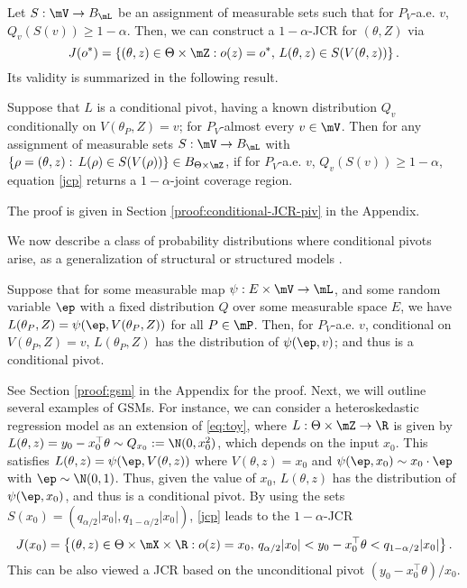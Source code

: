 \documentclass[english]{article}
\begin{document}
Let $S: \mV \to B_{\mL}$ be an assignment of measurable sets such that for $P_V$-a.e. $v$,  $Q_v(S(v))\ge 1-\alpha$.
Then, we can 
 construct a  $1-\alpha$-JCR for $(\theta,Z)$ via
\begin{equation}\label{jcp}
    J(o^*)= \left\{(\theta,z) 
\in\Theta\times\mZ: 
o(z) = o^*,\,
L(\theta,z) \in S(V(\theta,z)) \right\}.
\end{equation}
Its validity is summarized in the following result.
\begin{theorem}\label{thm:conditional-JCR-piv}
Suppose that $L$ is a conditional pivot, having a known distribution $Q_v$ conditionally on $V(\theta_P,Z)=v$; 
for $P_V$-almost every $v\in\mV$. 
Then for any assignment of measurable sets $S: \mV \to B_{\mL}$ with $\{\rho = (\theta,z):\, L(\rho) \in S(V(\rho))\} \in B_{\Theta\times \mZ}$, if for $P_V$-a.e. $v$,  $Q_v(S(v))\ge 1-\alpha$, 
equation \eqref{jcp} returns a $1-\alpha$-joint coverage region. 
\end{theorem}
The proof is given in Section \ref{proof:conditional-JCR-piv} in the Appendix.

We now describe a class of probability distributions where conditional pivots arise, as a generalization of structural or structured models \citep{fraser1966structural,fraser1968structure,fraser1971events}.
\begin{proposition}\label{prop:gsm}
    Suppose that
for some 
measurable map
$\psi:E\times \mV\to \mL$, and
some random variable $\ep$ with a fixed distribution $Q$ over some measurable space $E$,
we have
$L(\theta_P,Z) = \psi(\ep, V(\theta_P,Z))$  for all $P\in \mP$. Then, for $P_V$-a.e. $v$, conditional on $V(\theta_P,Z)=v$, $L(\theta_P,Z)$ has the distribution of $\psi(\ep,v)$; and thus is a conditional pivot.
\end{proposition}
See Section \ref{proof:gsm}
 in the Appendix for the proof.
Next, we will outline several examples of GSMs.
For instance, we can consider a heteroskedastic regression model as an extension of \eqref{eq:toy}, where
$L:\Theta\times\mZ\to \R$ is given by
$ L(\theta,z) = y_0 - x_0^\top\theta \sim Q_{x_0} := \N(0,x_0^2)$, which depends on the input $x_0$.
This satisfies $L(\theta,z)=\psi(\ep,V(\theta,z))$ where $V(\theta,z)=x_0$ and $\psi(\ep,x_0) \sim x_0\cdot \ep$ with $\ep \sim \N(0,1)$.
Thus, given the value of $x_0$, $L(\theta,z)$ has the distribution of $\psi(\ep,x_0)$, and thus is a conditional pivot.
By using the sets 
$S(x_0) = (q_{\alpha/2}|x_0|, q_{1 - \alpha/2}|x_0|)$,
\eqref{jcp} leads to the
$1-\alpha$-JCR
\begin{align*}
    J(x_0)=\left\{ (\theta,z) \in \Theta\times \mX\times \R: o(z)=x_0,\,  q_{\alpha/2}|x_0| < y_0 - x_0^\top \theta < q_{1 - \alpha/2}|x_0|\right  \}.
\end{align*}
This can be also viewed a JCR based on the unconditional pivot $(y_0 - x_0^\top \theta)/x_0$. 
\end{document}
